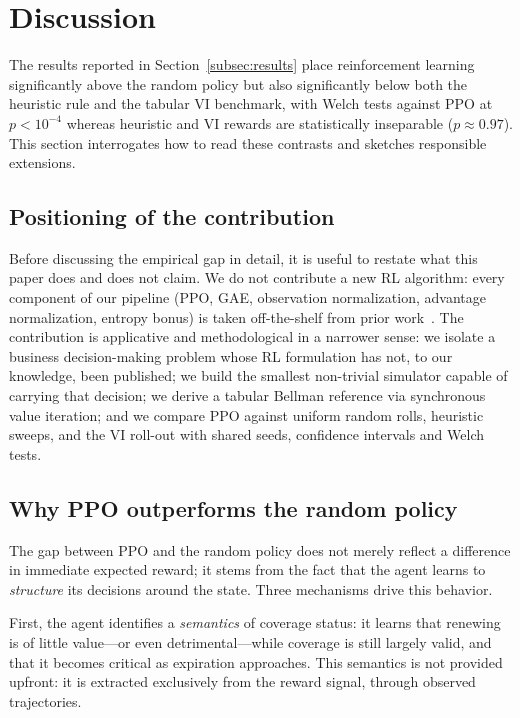 \section{Discussion}
\label{sec:discussion}

The results reported in Section~\ref{subsec:results} place reinforcement learning significantly above the random policy but also significantly below both the heuristic rule and the tabular VI benchmark, with Welch tests against PPO at $p < 10^{-4}$ whereas heuristic and VI rewards are statistically inseparable ($p \approx 0.97$). This section interrogates how to read these contrasts and sketches responsible extensions.


\subsection{Positioning of the contribution}
\label{subsec:positioning}

Before discussing the empirical gap in detail, it is useful to restate what this paper does and does not claim. We do not contribute a new RL algorithm: every component of our pipeline (PPO, GAE, observation normalization, advantage normalization, entropy bonus) is taken off-the-shelf from prior work~\cite{schulman2017ppo, schulman2016gae, andrychowicz2021matters}. The contribution is applicative and methodological in a narrower sense: we isolate a business decision-making problem whose RL formulation has not, to our knowledge, been published; we build the smallest non-trivial simulator capable of carrying that decision; we derive a tabular Bellman reference via synchronous value iteration; and we compare PPO against uniform random rolls, heuristic sweeps, and the VI roll-out with shared seeds, confidence intervals and Welch tests.


\subsection{Why PPO outperforms the random policy}
\label{subsec:why-ppo-beats-random}

The gap between PPO and the random policy does not merely reflect a difference in immediate expected reward; it stems from the fact that the agent learns to \emph{structure} its decisions around the state. Three mechanisms drive this behavior.

First, the agent identifies a \emph{semantics} of coverage status: it learns that renewing is of little value---or even detrimental---while coverage is still largely valid, and that it becomes critical as expiration approaches. This semantics is not provided upfront: it is extracted exclusively from the reward signal, through observed trajectories.

